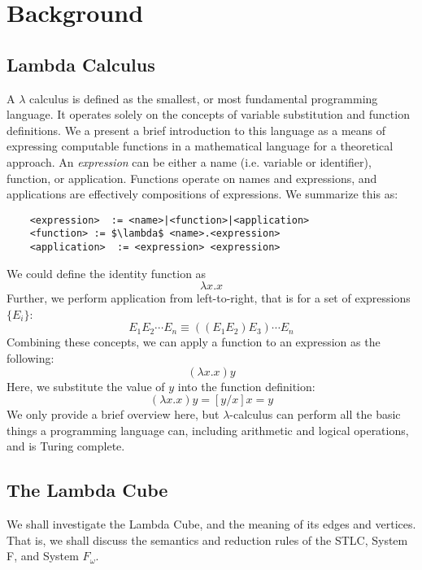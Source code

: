 \documentclass[conference]{IEEEtran}
\begin{document}
\section{Background}

\subsection{Lambda Calculus}

A $\lambda$ calculus is defined as the smallest, or most fundamental programming language. It operates solely on the concepts of variable substitution and function definitions. We a present a brief introduction to this language as a means of expressing computable functions in a mathematical language for a theoretical approach\cite{rojas2015tutorial}. An \textit{expression} can be either a name (i.e. variable or identifier), function, or application. Functions operate on names and expressions, and applications are effectively compositions of expressions. We summarize this as:

\begin{lstlisting}
    <expression>  := <name>|<function>|<application> 
    <function> := $\lambda$ <name>.<expression>
    <application>  := <expression> <expression>
\end{lstlisting}

We could define the identity function as
\begin{equation*}
    \lambda x.x
\end{equation*}
Further, we perform application from left-to-right, that is for a set of expressions $\{E_i\}$:
\begin{equation*}
    E_1E_2\cdots E_n\equiv ((E_1E_2)E_3)\cdots E_n
\end{equation*}
Combining these concepts, we can apply a function to an expression as the following:
\begin{equation*}
    (\lambda x.x)y
\end{equation*}
Here, we substitute the value of $y$ into the function definition:
\begin{equation*}
    (\lambda x.x)y=[y/x]x=y
\end{equation*}
We only provide a brief overview here, but $\lambda$-calculus can perform all the basic things a programming language can, including arithmetic and logical operations, and is Turing complete.

\subsection{The Lambda Cube}
We shall investigate the Lambda Cube, and the meaning of its edges and vertices. That is, we shall discuss the semantics and reduction rules of the STLC, System F, and System $F_\omega$.\cite{lambdavending}
\end{document}
